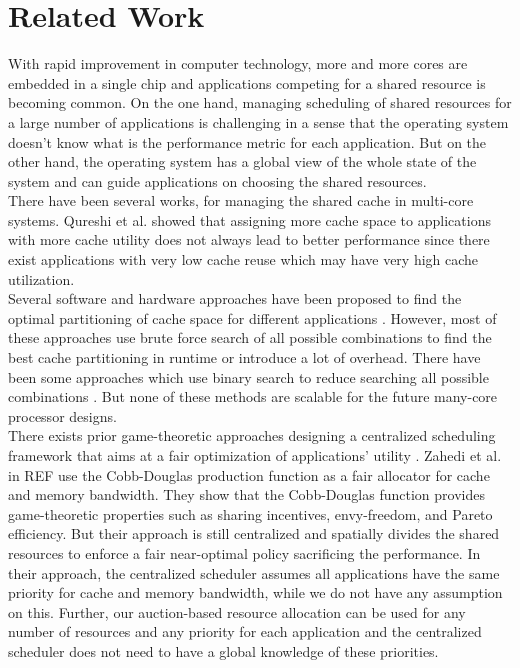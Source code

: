 \section{Related Work} \label{Related_works}
With rapid improvement in computer technology, more and more cores are embedded in a single chip and applications competing for a shared resource is becoming common. On the one hand, managing scheduling of shared resources for a large number of applications is challenging in a sense that the operating system doesn't know what is the performance metric for each application. But on the other hand, the operating system has a global view of the whole state of the system and can guide applications on choosing the shared resources.\\ 
\indent There have been several works, for managing the shared cache in multi-core systems. Qureshi et al. \cite{qureshi2006utility} showed that assigning more cache space to applications with more cache utility does not always lead to better performance since there exist applications with very low cache reuse which may have very high cache utilization. \\
\indent Several software and hardware approaches have been proposed to find the optimal partitioning of cache space for different applications \cite{zhuravlev2010addressing}. However, most of these approaches use brute force search of all possible combinations to find the best cache partitioning in runtime or introduce a lot of overhead. There have been some approaches which use binary search to reduce searching all possible combinations \cite{kim2004fair, lin2008gaining, tam2009rapidmrc}. But none of these methods are scalable for the future many-core processor designs.\\
\indent There exists prior game-theoretic approaches designing a centralized scheduling framework that aims at a fair optimization of applications' utility \cite{zahedi2014ref, llull2017cooper, ghodsi2011dominant, zahedi2015sharing, fan2016computational}. Zahedi et al. in REF \cite{zahedi2014ref, zahedi2015sharing} use the Cobb-Douglas production function as a fair allocator for cache and memory bandwidth. They show that the Cobb-Douglas function provides game-theoretic properties such as sharing incentives, envy-freedom, and Pareto efficiency. But their approach is still centralized and spatially divides the shared resources to enforce a fair near-optimal policy sacrificing the performance. In their approach, the centralized scheduler assumes all applications have the same priority for cache and memory bandwidth, while we do not have any assumption on this. Further, our auction-based resource allocation can be used for any number of resources and any priority for each application and the centralized scheduler does not need to have a global knowledge of these priorities.  \\
